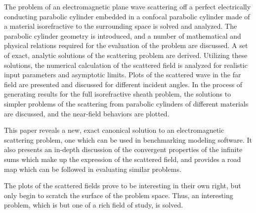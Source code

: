 \summary

The problem of an electromagnetic plane wave scattering off a perfect electrically conducting parabolic cylinder embedded in a confocal parabolic cylinder made of a material isorefractive to the surrounding space is solved and analyzed. The parabolic cylinder geometry is introduced, and a number of mathematical and physical relations required for the evaluation of the problem are discussed. A set of exact, analytic solutions of the scattering problem are derived. Utilizing these solutions, the numerical calculation of the scattered field is analyzed for realistic input parameters and asymptotic limits. Plots of the scattered wave in the far field are presented and discussed for different incident angles. In the process of generating results for the full isorefractive sheath problem, the solutions to simpler problems of the scattering from parabolic cylinders of different materials are discussed, and the near-field behaviors are plotted. 

This paper reveals a new, exact canonical solution to an electromagnetic scattering problem, one which can be used in benchmarking modeling software. It also presents an in-depth discussion of the convergent properties of the infinite sums which make up the expression of the scattered field, and provides a road map which can be followed in evaluating similar problems. 

The plots of the scattered fields prove to be interesting in their own right, but only begin to scratch the surface of the problem space. Thus, an interesting problem, which is but one of a rich field of study, is solved. 